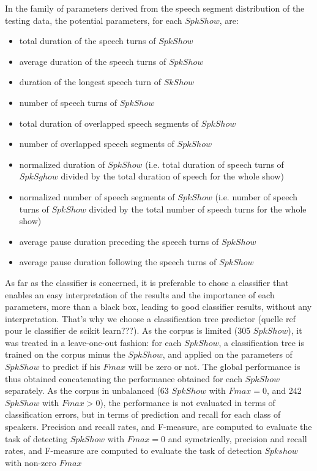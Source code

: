 In the family of parameters derived from the speech segment distribution of the testing data, the potential parameters, for each $SpkShow$, are:
\begin{itemize}
\item total duration of the speech turns of $SpkShow$
\item average duration of the speech turns of $SpkShow$
\item duration of the longest speech turn of $SkShow$
\item number of speech turns of $SpkShow$
\item total duration of overlapped speech segments of $SpkShow$
\item number of overlapped speech segments of $SpkShow$
\item normalized duration of $SpkShow$ (i.e. total duration of speech turns of $SpkSghow$ divided by the total duration of speech for the whole show)
\item normalized number of speech segments of $SpkShow$ (i.e.   number of speech turns of $SpkShow$ divided by the total number of speech turns for the whole show) 
\item average pause duration preceding the speech turns of $SpkShow$
\item average pause duration following the speech turns of $SpkShow$
\end{itemize}

As far as the classifier is concerned, it is preferable to chose a classifier that enables an easy interpretation of the results and the importance of each parameters, more than a black box, leading to good classifier results, without any interpretation. That's why we choose a classification tree predictor (quelle ref pour le classifier de scikit learn???).
As the corpus is limited (305 $SpkShow$), it was treated in a leave-one-out fashion: for each $SpkShow$, a classification tree is trained on the corpus minus the $SpkShow$, and applied on the parameters of $SpkShow$ to predict if his $Fmax$ will be zero or not. The global performance is thus obtained concatenating the performance obtained for each $SpkShow$ separately.
As the corpus in unbalanced (63 $SpkShow$ with $Fmax=0$, and 242 $SpkShow$ with $Fmax>0$), the performance is not evaluated in terms of classification errors, but in terms of prediction and recall for each class of speakers. Precision and recall rates, and F-measure,  are computed to evaluate the task of detecting $SpkShow$ with $Fmax=0$ and symetrically, precision and recall rates, and F-measure are computed to evaluate the task of detection $Spkshow$ with non-zero $Fmax$

